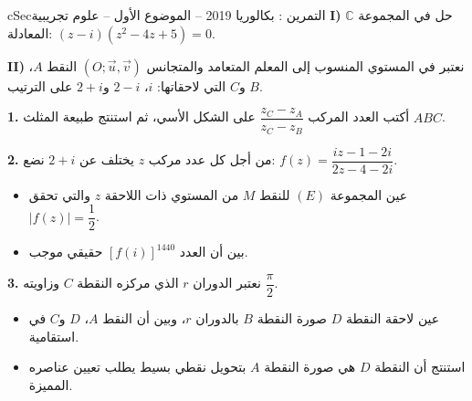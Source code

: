\documentclass[12pt,a4paper]{article}
\newenvironment{BOX}[2]{\begin{otherlanguage}{english}\begin{arbox}{#1}{#2}}{\end{arbox}\end{otherlanguage}}
\newcounter{exo}
\newenvironment{tamrin}[1]{\stepcounter{exo}\begin{BOX}{cSec}{التمرين \theexo: #1}}{\end{BOX}}
\newenvironment{sq}{\begin{itemize}[leftmargin=2.4em,itemsep=3pt]}{\end{itemize}}
\newcommand{\qa}{\item[(أ)]}\newcommand{\qb}{\item[(ب)]}\newcommand{\qc}{\item[(جـ)]}\newcommand{\qd}{\item[(د)]}\newcommand{\qe}{\item[(هـ)]}
\newcommand{\QQ}[1]{\par\smallskip\textbf{#1.} }
\begin{document}
\begin{tamrin}{بكالوريا 2019 -- الموضوع الأول -- علوم تجريبية}
\textbf{I)} حل في المجموعة $\mathbb{C}$ المعادلة: $(z-i)\left(z^2-4z+5\right)=0$.

\textbf{II)} نعتبر في المستوي المنسوب إلى المعلم المتعامد والمتجانس $(O;\vec u,\vec v)$ النقط $A$، $B$ و$C$ التي لاحقاتها: $i$، $2-i$ و$2+i$ على الترتيب.
\QQ{1} أكتب العدد المركب $\dfrac{z_C-z_A}{z_C-z_B}$ على الشكل الأسي، ثم استنتج طبيعة المثلث $ABC$.
\QQ{2} من أجل كل عدد مركب $z$ يختلف عن $2+i$ نضع: $f(z)=\dfrac{iz-1-2i}{2z-4-2i}$.
\begin{sq}
\qa عين المجموعة $(E)$ للنقط $M$ من المستوي ذات اللاحقة $z$ والتي تحقق $|f(z)|=\dfrac12$.
\qb بين أن العدد $\left[f(i)\right]^{1440}$ حقيقي موجب.
\end{sq}
\QQ{3} نعتبر الدوران $r$ الذي مركزه النقطة $C$ وزاويته $\dfrac{\pi}{2}$.
\begin{sq}
\qa عين لاحقة النقطة $D$ صورة النقطة $B$ بالدوران $r$، وبين أن النقط $A$، $D$ و$C$ في استقامية.
\qb استنتج أن النقطة $D$ هي صورة النقطة $A$ بتحويل نقطي بسيط يطلب تعيين عناصره المميزة.
\end{sq}
\end{tamrin}
\end{document}
